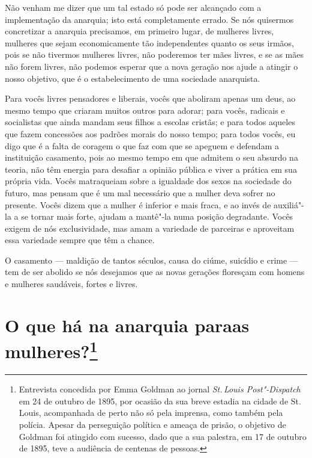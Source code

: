 Não venham me dizer que um tal estado só pode ser alcançado com a
implementação da anarquia; isto está completamente errado. Se nós
quisermos concretizar a anarquia precisamos, em primeiro lugar, de mulheres livres, mulheres que sejam economicamente tão
independentes quanto os seus irmãos, pois se não tivermos mulheres
livres, não poderemos ter mães livres, e se as mães não forem livres,
não podemos esperar que a nova geração nos ajude a atingir o nosso
objetivo, que é o estabelecimento de uma sociedade anarquista.

Para vocês livres pensadores e liberais, vocês que aboliram apenas um deus, ao mesmo tempo que criaram muitos outros para adorar; para vocês, radicais e
socialistas que ainda mandam seus filhos a escolas cristãs; e para
todos aqueles que fazem concessões aos padrões morais do nosso tempo;
para todos vocês, eu digo que é a falta de coragem o que faz com que
se apeguem e defendam a instituição casamento, pois ao mesmo tempo
em que admitem o seu absurdo na teoria, não têm energia para
desafiar a opinião pública e viver a prática em sua própria vida. Vocês
matraqueiam sobre a igualdade dos sexos na sociedade do futuro, mas\label{matraqueiam}
pensam que é um mal necessário que a mulher deva sofrer no presente.
Vocês dizem que a mulher é inferior e mais fraca, e ao invés de
auxiliá"-la a se tornar mais forte, ajudam a mantê"-la numa posição
degradante. Vocês exigem de nós exclusividade, mas amam a variedade de
parceiras e aproveitam essa variedade sempre que têm a chance.

O casamento --- maldição de tantos séculos, causa do ciúme, suicídio e
crime --- tem de ser abolido se nós desejamos que as novas gerações
floresçam com homens e mulheres saudáveis, fortes e livres.

\chapter[O que há na anarquia para as mulheres?]{O que há na anarquia para\break as mulheres?\footnote{Entrevista concedida por Emma Goldman
  ao jornal \emph{St.\,Louis Post"-Dispatch} em 24 de outubro de 1895, por
  ocasião da sua breve estadia na cidade de St.\,Louis, acompanhada de
  perto não só pela imprensa, como também pela polícia. Apesar da
  perseguição política e ameaça de prisão, o objetivo de Goldman foi
  atingido com sucesso, dado que a sua palestra, em 17 de outubro de
  1895, teve a audiência de centenas de pessoas.}}

